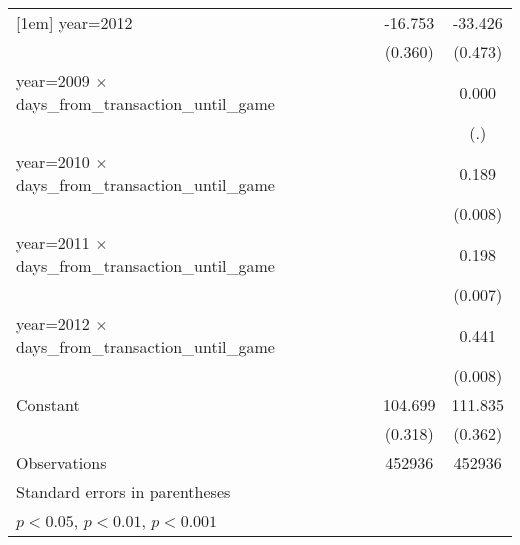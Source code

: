 {\begin{tabular}{l*{2}{c}}
[1em]
year=2012           &     -16.753\sym{***}&     -33.426\sym{***}\\
                    &     (0.360)         &     (0.473)         \\
[1em]
year=2009 $\times$ days\_from\_transaction\_until\_game&                     &       0.000         \\
                    &                     &         (.)         \\
[1em]
year=2010 $\times$ days\_from\_transaction\_until\_game&                     &       0.189\sym{***}\\
                    &                     &     (0.008)         \\
[1em]
year=2011 $\times$ days\_from\_transaction\_until\_game&                     &       0.198\sym{***}\\
                    &                     &     (0.007)         \\
[1em]
year=2012 $\times$ days\_from\_transaction\_until\_game&                     &       0.441\sym{***}\\
                    &                     &     (0.008)         \\
[1em]
Constant            &     104.699\sym{***}&     111.835\sym{***}\\
                    &     (0.318)         &     (0.362)         \\
\hline
Observations        &      452936         &      452936         \\
\hline\hline
\multicolumn{3}{l}{\footnotesize Standard errors in parentheses}\\
\multicolumn{3}{l}{\footnotesize \sym{*} \(p<0.05\), \sym{**} \(p<0.01\), \sym{***} \(p<0.001\)}\\
\end{tabular}
}
